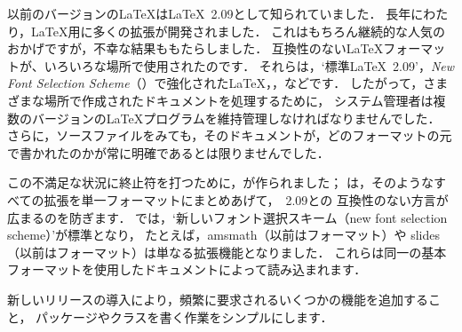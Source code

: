 \documentclass{ltxguide}[2001/05/28]
\begin{document}
以前のバージョンの\LaTeX{}は\LaTeX{}~2.09として知られていました．
長年にわたり，\LaTeX{}用に多くの拡張が開発されました．
これはもちろん継続的な人気のおかげですが，不幸な結果ももたらしました．
互換性のない\LaTeX{}フォーマットが、いろいろな場所で使用されたのです．
それらは，`標準\LaTeX{}~2.09'，\emph{New Font Selection Scheme}（\NFSS）で強化された\LaTeX{}，\SLiTeX{}，\AmSLaTeX{}などです．
したがって，さまざまな場所で作成されたドキュメントを処理するために，
システム管理者は複数のバージョンの\LaTeX{}プログラムを維持管理しなければなりませんでした．
さらに，ソースファイルをみても，そのドキュメントが，どのフォーマットの元で書かれたのかが常に明確であるとは限りませんでした．

この不満足な状況に終止符を打つために，\LaTeXe{}が作られました；
\LaTeXe{}は，そのようなすべての拡張を単一フォーマットにまとめあげて，\LaTeXe{}~2.09との
互換性のない方言が広まるのを防ぎます．
\LaTeXe{}では，`新しいフォント選択スキーム（new font selection scheme）'が標準となり，
たとえば，\textsf {amsmath}（以前は\AmSLaTeX{}フォーマット）や
\textsf{slides}（以前は\SLiTeX{}フォーマット）は単なる拡張機能となりました．
これらは同一の基本フォーマットを使用したドキュメントによって読み込まれます．

新しいリリースの導入により，頻繁に要求されるいくつかの機能を追加すること，
パッケージやクラスを書く作業をシンプルにします．
\end{document}
